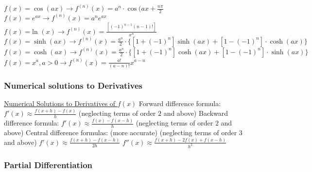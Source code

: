 \documentclass[12pt]{article}
\def\ln{\text{ln\ }} %
\begin{document}
\begin{flushleft}
	\textbullet \quad $\displaystyle f(x) = \cos (ax) \rightarrow f^{(n)}(x) = a^n \cdot \cos (ax + \frac{n\pi}{2} $ \linebreak 
	\textbullet \quad $\displaystyle f(x) = e^{ax} \rightarrow f^{(n)}(x) = a^n e^{ax} $ \linebreak 
	\textbullet \quad $\displaystyle f(x) = \ln(x) \rightarrow f^{(n)}(x) = \frac{\left[ (-1)^{n-1} (n-1)! \right]}{x^n} $ \linebreak 
	\textbullet \quad $\displaystyle f(x) = \sinh (ax) \rightarrow f^{(n)}(x) = \frac{a^n}{2} \cdot \{ [1+(-1)^n] \sinh (ax) + [1-(-1)^n] \cdot \cosh (ax) \}$ \linebreak 
	\textbullet \quad $\displaystyle f(x) = \cosh (ax) \rightarrow f^{(n)}(x) = \frac{a^n}{2} \cdot \{[1+(-1)^n] \cosh (ax) +[1-(-1)^n] \cdot \sinh (ax) \} $ \linebreak 
	\textbullet \quad $\displaystyle f(x) = x^a, a> 0 \rightarrow f^{(n)} (x) = \frac{a!}{(a-n)!} x^{a-n} $ \linebreak 
	
	\subsubsection{Numerical solutions to Derivatives} 
	
	\uline{Numerical Solutions to Derivatives of $f(x)$} \linebreak 
	\textbullet \quad Forward difference formula: $\displaystyle f'(x) \approx \frac{f(x+h)-f(x)}{h}$ \linebreak 
	(neglecting terms of order $2$ and above) 
	\textbullet \quad Backward difference formula: $\displaystyle f'(x) \approx \frac{f(x) - f(x-h)}{h}$ \linebreak 
	(neglecting terms of order $2$ and above) 
	\textbullet \quad Central difference formulas: (more accurate) (neglecting terms of order $3$ and above) \linebreak 
	$\displaystyle f'(x) \approx \frac{f(x+h) - f(x-h)}{2h} $ \linebreak 
	$\displaystyle f''(x) \approx \frac{f(x+h) -2f(x) + f(x-h)}{h^2} $ \linebreak 
	
	\subsubsection{Partial Differentiation}	
	

\end{flushleft}
\end{document}
